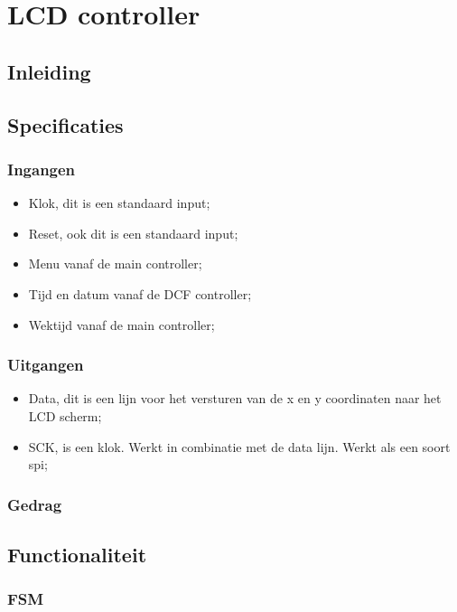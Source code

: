 \chapter{LCD controller}
\section{Inleiding}


\section{Specificaties}
\subsection{Ingangen}
\begin{itemize}[nolistsep]
\item Klok, dit is een standaard input;
\item Reset, ook dit is een standaard input;
\item Menu vanaf de main controller;
\item Tijd en datum vanaf de DCF controller;
\item Wektijd vanaf de main controller;
\end{itemize}



\subsection{Uitgangen}
\begin{itemize}[nolistsep]
\item Data, dit is een lijn voor het versturen van de x en y coordinaten naar het LCD scherm;
\item SCK, is een klok. Werkt in combinatie met de data lijn. Werkt als een soort spi;
\end{itemize}
\subsection{Gedrag}

\section{Functionaliteit}

\subsection{FSM}


